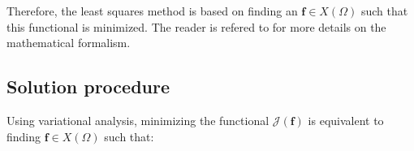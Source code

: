\documentclass{CFD2011}
\newcommand{\Fede}[1]{\textcolor{green}{Fede: #1} \\}
\newcommand{\Pablo}[1]{#1}
\begin{document}

Therefore, the least squares method is based on finding an $\mathbf{f} \in X(\Omega)$ such that this functional is minimized. The reader is refered to \cite{Bochev2009} for more details on the mathematical formalism. 
%
%
%

\subsection{Solution procedure}

Using variational analysis, minimizing the functional $\mathcal{J}(\mathbf{f})$ is equivalent to finding $\mathbf{f} \in X(\Omega)$ such that:
\end{document}
